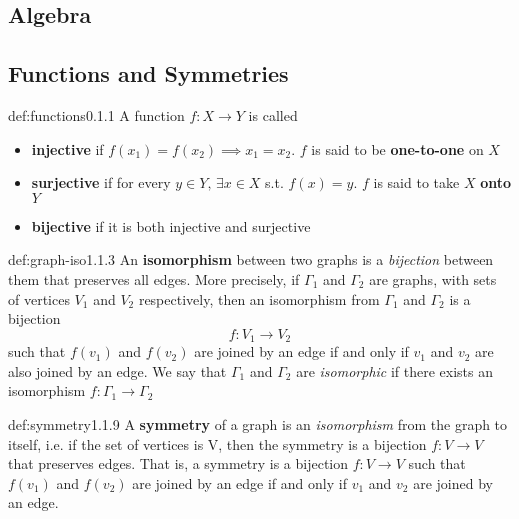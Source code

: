 \documentclass[landscape, 8pt]{extarticle}
\begin{document}
\setlength{\abovedisplayskip}{3.5pt}
\setlength{\belowdisplayskip}{3.5pt}
\setlength{\abovedisplayshortskip}{3.5pt}
\setlength{\belowdisplayshortskip}{3.5pt}

\begin{multicols}{3}
\raggedcolumns
\section{\huge Algebra}
\subsection*{Functions and Symmetries}

\begin{dfn}[Functions]{def:functions}{0.1.1}
A function $f:X\to Y$ is called
\renewcommand\labelitemi{\tiny$\bullet$}
\begin{itemize}
    \setlength\itemsep{0em}
    \item \textbf{injective} if $f(x_{1}) = f(x_{2}) \implies x_{1} = x_{{2}}$. $f$ is said to be \textbf{one-to-one} on $X$
    \item \textbf{surjective} if for every $y\in Y,\, \exists x\in X$ s.t. $f(x) = y$. $f$ is said to take $X$ \textbf{onto} $Y$
    \item \textbf{bijective} if it is both injective and surjective
\end{itemize}
\end{dfn}
\vspace{-5pt}

\begin{dfn}{def:graph-iso}{1.1.3}
    An \textbf{isomorphism} between two graphs is a \textit{bijection} between them that preserves all edges. More precisely, if $\Gamma_{1}$ and $\Gamma_{2}$ are graphs, with sets of vertices $V_{1}$ and $V_{2}$ respectively, then an isomorphism from $\Gamma_{1}$ and $\Gamma_{2}$ is a bijection
    \[f : V_{1}\to V_{2}\]
    such that $f(v_{1})$ and $f(v_{2})$ are joined by an edge if and only if $v_{1}$ and $v_{2}$ are also joined by an edge.
    We say that $\Gamma_{1}$ and $\Gamma_{2}$ are \textit{isomorphic} if there exists an isomorphism $f:\Gamma_{1}\to\Gamma_{2}$
\end{dfn}
\vspace{-5pt}

\begin{dfn}[Symmetry]{def:symmetry}{1.1.9}
    A \textbf{symmetry} of a graph is an \textit{isomorphism} from the graph to itself, i.e. if the set of vertices is V, then the symmetry is a bijection $f:V\to V$ that preserves edges. That is, a symmetry is a bijection $f:V\to V$ such that $f(v_{1})$ and $f(v_{2})$ are joined by an edge if and only if $v_{1}$ and $v_{2}$ are joined by an edge.
\end{dfn}
\vspace{-5pt}


\end{multicols}
\end{document}
